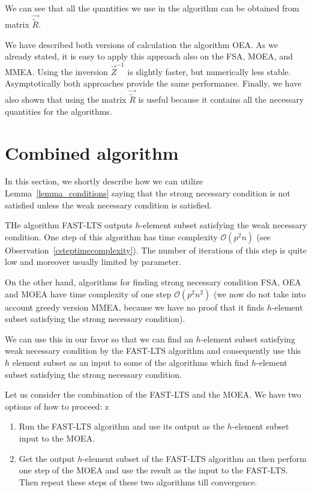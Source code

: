 \begin{remark} \label{qnotrequiredspeedupremark}
    We can see that all the quantities we use in the algorithm can be obtained from matrix $\vec{\tilde{R}}$.
\end{remark}

We have described both versions of calculation the algorithm OEA. As we already stated, it is easy to apply this approach also on the FSA, MOEA, and MMEA. Using the inversion $\vec{Z}^{-1}$ is slightly faster, but numerically less stable. Asymptotically both approaches provide the same performance. Finally, we have also shown that using the matrix $\vec{\tilde{R}}$ is useful because it contains all the necessary quantities for the algorithms.









\section{Combined algorithm} \label{sectioncombined}
In this section, we shortly describe how we can utilize Lemma~\ref{lemma_conditions} saying that the strong necessary condition is not satisfied unless the weak necessary condition is satisfied.

THe algorithm FAST-LTS outputs $h$-element subset satisfying the weak necessary condition. One step of this algorithm has time complexity $\mathcal{O}(p^2n)$ (see Observation~\ref{csteptimecomplexity}). The number of iterations of this step is quite low and moreover usually limited by parameter. 

On the other hand, algorithms for finding strong necessary condition FSA, OEA and MOEA have time complexity of one step $\mathcal{O}(p^2n^2)$ (we now do not take into account greedy version MMEA, because we have no proof that it finds $h$-element subset satisfying the strong necessary condition). 

We can use this in our favor so that we can find an $h$-element subset satisfying weak necessary condition by the FAST-LTS algorithm and consequently use this $h$ element subset as an input to some of the algorithms which find $h$-element subset satisfying the strong necessary condition.

Let us consider the combination of the FAST-LTS and the MOEA. We have two options of how to proceed:
z
\begin{enumerate}
    \item Run the FAST-LTS algorithm and use its output as the $h$-element subset input to the MOEA.
    \item Get the output $h$-element subset of the FAST-LTS algorithm an then perform one step of the MOEA and use the result as the input to the FAST-LTS. Then repeat these steps of these two algorithms till convergence.
\end{enumerate}

